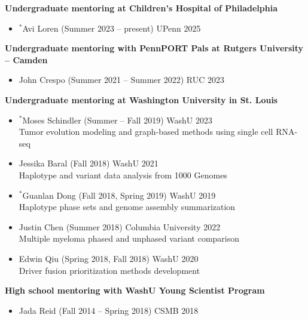 \documentclass[11pt]{article}
\begin{document}
\bigskip

\textbf{Undergraduate mentoring at Children's Hospital of Philadelphia}

\begin{itemize}
  \item $^*$Avi Loren (Summer 2023 -- present) \hfill UPenn 2025
\end{itemize}

\bigskip

\textbf{Undergraduate mentoring with PennPORT Pals at Rutgers University -- Camden}

\begin{itemize}
	\item John Crespo (Summer 2021 -- Summer 2022) \hfill RUC 2023
\end{itemize}

\bigskip

\textbf{Undergraduate mentoring at Washington University in St. Louis}

\begin{itemize}
	\item $^*$Moses Schindler (Summer -- Fall 2019) \hfill WashU 2023 \\ Tumor evolution modeling and graph-based methods using single cell RNA-seq
	\item Jessika Baral (Fall 2018) \hfill WashU 2021 \\ Haplotype and variant data analysis from 1000 Genomes
	\item $^*$Guanlan Dong (Fall 2018, Spring 2019) \hfill WashU 2019 \\ Haplotype phase sets and genome assembly summarization
	\item Justin Chen (Summer 2018) \hfill Columbia University 2022 \\ Multiple myeloma phased and unphased variant comparison
	\item Edwin Qiu (Spring 2018, Fall 2018) \hfill WashU 2020 \\ Driver fusion prioritization methods development
\end{itemize}

\bigskip

\textbf{High school mentoring with WashU Young Scientist Program}

\begin{itemize}
	\item Jada Reid (Fall 2014 -- Spring 2018) \hfill CSMB 2018
\end{itemize}

\hrulefill
\end{document}
